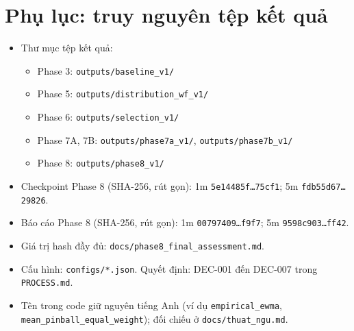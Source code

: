 \documentclass[11pt,a4paper]{article}
\begin{document}
\section*{Phụ lục: truy nguyên tệp kết quả}

\begin{itemize}[nosep]
\item Thư mục tệp kết quả:
  \begin{itemize}[nosep]
  \item Phase 3: \texttt{outputs/baseline\_v1/}
  \item Phase 5: \texttt{outputs/distribution\_wf\_v1/}
  \item Phase 6: \texttt{outputs/selection\_v1/}
  \item Phase 7A, 7B: \texttt{outputs/phase7a\_v1/}, \texttt{outputs/phase7b\_v1/}
  \item Phase 8: \texttt{outputs/phase8\_v1/}
  \end{itemize}
\item Checkpoint Phase 8 (SHA-256, rút gọn): 1m \texttt{5e14485f\ldots 75cf1}; 5m \texttt{fdb55d67\ldots 29826}.
\item Báo cáo Phase 8 (SHA-256, rút gọn): 1m \texttt{00797409\ldots f9f7}; 5m \texttt{9598c903\ldots ff42}.
\item Giá trị hash đầy đủ: \texttt{docs/phase8\_final\_assessment.md}.
\item Cấu hình: \texttt{configs/*.json}. Quyết định: DEC-001 đến DEC-007 trong \texttt{PROCESS.md}.
\item Tên trong code giữ nguyên tiếng Anh (ví dụ \texttt{empirical\_ewma}, \texttt{mean\_pinball\_equal\_weight}); đối chiếu ở \texttt{docs/thuat\_ngu.md}.
\end{itemize}
\end{document}

